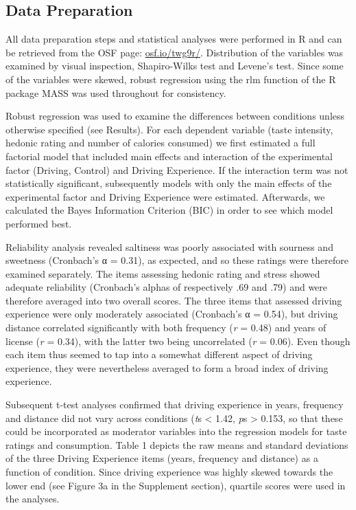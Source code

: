 \documentclass[authordate, empirical]{jote-new-article}
\begin{document}
\subsection{Data Preparation}



All data preparation steps and statistical analyses were performed in R \parencites{RCoreTeam2019} and can be retrieved from the OSF page: \href{https://osf.io/twg9r/}{osf.io/twg9r/}. Distribution of the variables was examined by visual inspection, Shapiro-Wilks test and Levene’s test. Since some of the variables were skewed, robust regression using the rlm function of the R package MASS was used throughout for consistency.



Robust regression was used to examine the differences between conditions unless otherwise specified (see Results). For each dependent variable (taste intensity, hedonic rating and number of calories consumed) we first estimated a full factorial model that included main effects and interaction of the experimental factor (Driving, Control) and Driving Experience. If the interaction term was not statistically significant, subsequently models with only the main effects of the experimental factor and Driving Experience were estimated. Afterwards, we calculated the Bayes Information Criterion (BIC) in order to see which model performed best.



Reliability analysis revealed saltiness was poorly associated with sourness and sweetness (Cronbach’s α = 0.31), as expected, and so these ratings were therefore examined separately. The items assessing hedonic rating and stress showed adequate reliability (Cronbach’s alphas of respectively .69 and .79) and were therefore averaged into two overall scores. The three items that assessed driving experience were only moderately associated (Cronbach’s α = 0.54), but driving distance correlated significantly with both frequency (\emph{r} = 0.48) and years of license (\emph{r} = 0.34), with the latter two being uncorrelated (\emph{r} = 0.06). Even though each item thus seemed to tap into a somewhat different aspect of driving experience, they were nevertheless averaged to form a broad index of driving experience.




Subsequent t-test analyses confirmed that driving experience in years, frequency and distance did not vary across conditions (\emph{t}s < 1.42, \emph{p}s > 0.153, so that these could be incorporated as moderator variables into the regression models for taste ratings and consumption. Table 1 depicts the raw means and standard deviations of the three Driving Experience items (years, frequency and distance) as a function of condition. Since driving experience was highly skewed towards the lower end (see Figure 3a in the Supplement section), quartile scores were used in the analyses.
\end{document}

